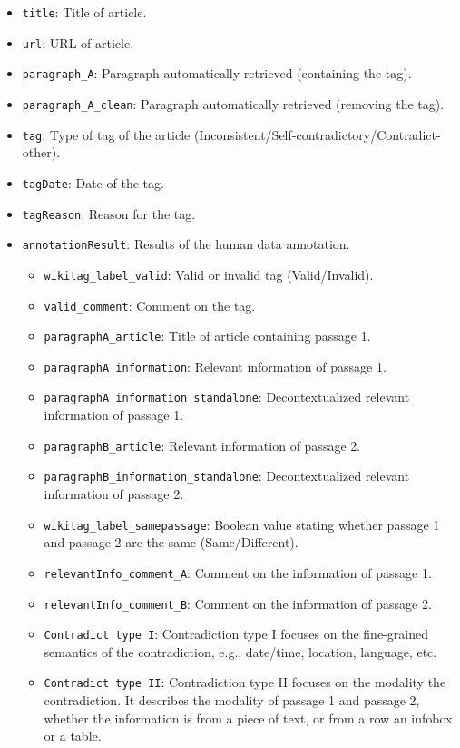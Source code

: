 \documentclass{article}
\begin{document}
\begin{itemize}
    \item \texttt{title}: Title of article.
    \item \texttt{url}: URL of article.
    \item \texttt{paragraph\_A}: Paragraph automatically retrieved (containing the tag).
    \item \texttt{paragraph\_A\_clean}: Paragraph automatically retrieved (removing the tag).
    \item \texttt{tag}: Type of tag of the article (Inconsistent/Self-contradictory/Contradict-other). 
    \item \texttt{tagDate}: Date of the tag.
    \item \texttt{tagReason}: Reason for the tag.
    \item  \texttt{annotationResult}: Results of the human data annotation.
    \begin{itemize}
        \item \texttt{wikitag\_label\_valid}: Valid or invalid tag (Valid/Invalid).
        \item \texttt{valid\_comment}: Comment on the tag.
        \item \texttt{paragraphA\_article}: Title of article containing passage 1.
        \item \texttt{paragraphA\_information}: Relevant information of passage 1.
        \item \texttt{paragraphA\_information\_standalone}: Decontextualized relevant information of passage 1.
        \item \texttt{paragraphB\_article}: Relevant information of passage 2.
        \item \texttt{paragraphB\_information\_standalone}: Decontextualized relevant information of passage 2.
        \item \texttt{wikitag\_label\_samepassage}: Boolean value stating whether passage 1 and passage 2 are the same (Same/Different).
        \item \texttt{relevantInfo\_comment\_A}: Comment on the information of passage 1.
        \item \texttt{relevantInfo\_comment\_B}: Comment on the information of passage 2.
        \item \texttt{Contradict type I}: Contradiction type I focuses on the fine-grained semantics of the contradiction, e.g., date/time, location, language, etc. 
        \item \texttt{Contradict type II}: Contradiction type II focuses on the modality the contradiction.  It describes the modality of passage 1 and passage 2, whether the information is from a piece of text, or from a row an infobox or a table. 

\end{itemize}
\end{itemize}
\end{document}
